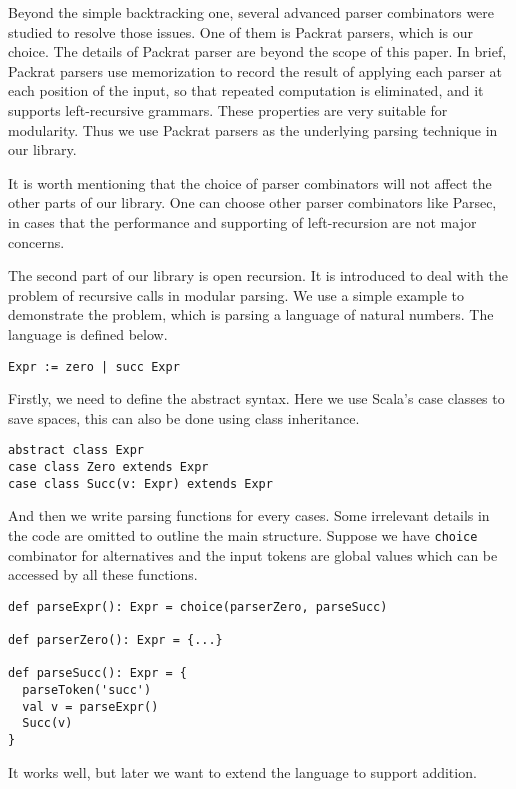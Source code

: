 Beyond the simple backtracking one, several advanced parser combinators were studied to resolve those issues. One of them is Packrat parsers, which is our choice. The details of Packrat parser are beyond the scope of this paper. In brief, Packrat parsers use memorization to record the result of applying each parser at each position of the input, so that repeated computation is eliminated, and it supports left-recursive grammars. These properties are very suitable for modularity. Thus we use Packrat parsers as the underlying parsing technique in our library.

It is worth mentioning that the choice of parser combinators will not affect the other parts of our library. One can choose other parser combinators like Parsec, in cases that the performance and supporting of left-recursion are not major concerns.

The second part of our library is open recursion. It is introduced to deal with the problem of recursive calls in modular parsing. We use a simple example to demonstrate the problem, which is parsing a language of natural numbers. The language is defined below.

\begin{lstlisting}[language=PlainCode]
Expr := zero | succ Expr
\end{lstlisting}

Firstly, we need to define the abstract syntax. Here we use Scala's case classes to save spaces, this can also be done using class inheritance.

\begin{lstlisting}
abstract class Expr
case class Zero extends Expr
case class Succ(v: Expr) extends Expr
\end{lstlisting}

And then we write parsing functions for every cases. Some irrelevant details in the code are omitted to outline the main structure. Suppose we have \lstinline{choice} combinator for alternatives and the input tokens are global values which can be accessed by all these functions.

\begin{lstlisting}
def parseExpr(): Expr = choice(parserZero, parseSucc)

def parserZero(): Expr = {...}

def parseSucc(): Expr = {
  parseToken('succ')
  val v = parseExpr()
  Succ(v)
}
\end{lstlisting}

It works well, but later we want to extend the language to support addition.

